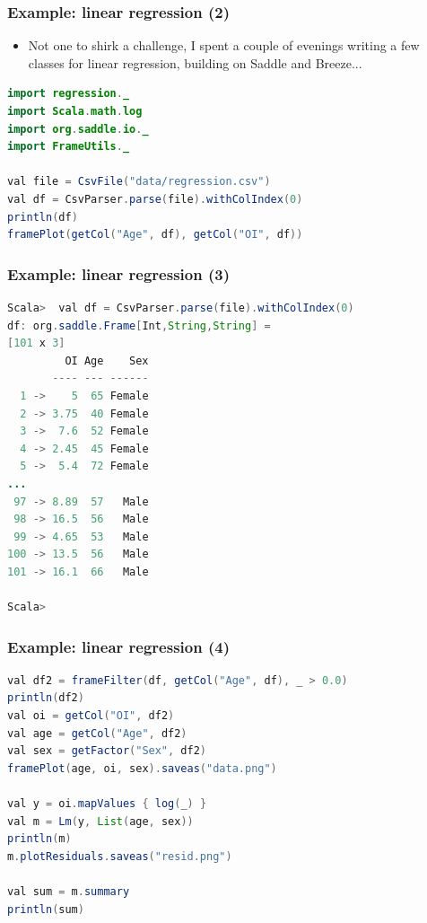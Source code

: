 \documentclass[mathserif,handout]{beamer}
\begin{document}
\begin{frame}[fragile]
\frametitle{Example: linear regression (2)}
\begin{itemize}
\item Not one to shirk a challenge, I spent a couple of evenings writing a few classes for linear regression, building on Saddle and Breeze...
\end{itemize}
{\small
\begin{lstlisting}[language=java]
import regression._
import Scala.math.log
import org.saddle.io._
import FrameUtils._

val file = CsvFile("data/regression.csv")
val df = CsvParser.parse(file).withColIndex(0)
println(df)
framePlot(getCol("Age", df), getCol("OI", df))
\end{lstlisting}
}
\end{frame}

\begin{frame}[fragile]
\frametitle{Example: linear regression (3)}
{\scriptsize
\begin{lstlisting}[language=java]
Scala>  val df = CsvParser.parse(file).withColIndex(0)
df: org.saddle.Frame[Int,String,String] =
[101 x 3]
         OI Age    Sex
       ---- --- ------
  1 ->    5  65 Female
  2 -> 3.75  40 Female
  3 ->  7.6  52 Female
  4 -> 2.45  45 Female
  5 ->  5.4  72 Female
...
 97 -> 8.89  57   Male
 98 -> 16.5  56   Male
 99 -> 4.65  53   Male
100 -> 13.5  56   Male
101 -> 16.1  66   Male

Scala> 
\end{lstlisting}
}
\end{frame}

\begin{frame}[fragile]
\frametitle{Example: linear regression (4)}
{\scriptsize
\begin{lstlisting}[language=java]
val df2 = frameFilter(df, getCol("Age", df), _ > 0.0)
println(df2)
val oi = getCol("OI", df2)
val age = getCol("Age", df2)
val sex = getFactor("Sex", df2)
framePlot(age, oi, sex).saveas("data.png")

val y = oi.mapValues { log(_) }
val m = Lm(y, List(age, sex))
println(m)
m.plotResiduals.saveas("resid.png")

val sum = m.summary
println(sum)
\end{lstlisting}
}
\end{frame}

\end{document}

